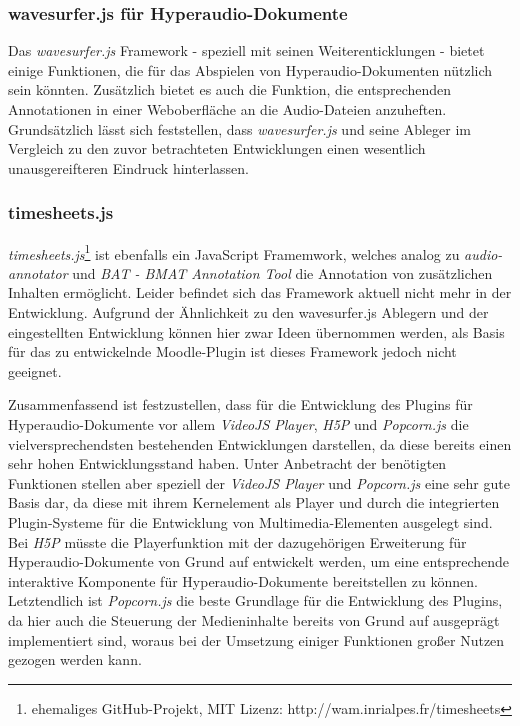 
\subsubsection{wavesurfer.js für Hyperaudio-Dokumente}
Das \textit{wavesurfer.js} Framework - speziell mit seinen Weiterenticklungen - bietet einige Funktionen, die für das Abspielen von Hyperaudio-Dokumenten nützlich sein könnten. Zusätzlich bietet es auch die Funktion,  die entsprechenden Annotationen in einer Weboberfläche an die Audio-Dateien anzuheften. Grundsätzlich lässt sich feststellen, dass \textit{wavesurfer.js} und seine Ableger im Vergleich zu den zuvor betrachteten Entwicklungen einen wesentlich unausgereifteren Eindruck hinterlassen.

\subsubsection{timesheets.js}
\textit{timesheets.js}\footnote{ehemaliges GitHub-Projekt, MIT Lizenz: http://wam.inrialpes.fr/timesheets} ist ebenfalls ein JavaScript Framemwork, welches analog zu \textit{audio-annotator} und \textit{BAT - BMAT Annotation Tool} die Annotation von zusätzlichen Inhalten ermöglicht. Leider befindet sich das Framework aktuell nicht mehr in der Entwicklung. Aufgrund der Ähnlichkeit zu den {wavesurfer.js} Ablegern und der eingestellten Entwicklung können hier zwar Ideen übernommen werden, als Basis für das zu entwickelnde Moodle-Plugin ist dieses Framework jedoch nicht geeignet.

Zusammenfassend ist festzustellen, dass für die Entwicklung des Plugins für Hyperaudio-Dokumente vor allem \textit{VideoJS Player}, \textit{H5P} und \textit{Popcorn.js} die vielversprechendsten bestehenden Entwicklungen darstellen, da diese bereits einen sehr hohen Entwicklungsstand haben. Unter Anbetracht der benötigten Funktionen stellen aber speziell der \textit{VideoJS Player} und \textit{Popcorn.js} eine sehr gute Basis dar, da diese mit ihrem Kernelement als Player und durch die integrierten Plugin-Systeme für die Entwicklung von Multimedia-Elementen ausgelegt sind. Bei \textit{H5P} müsste die Playerfunktion mit der dazugehörigen Erweiterung für Hyperaudio-Dokumente von Grund auf entwickelt werden, um eine entsprechende interaktive Komponente für Hyperaudio-Dokumente bereitstellen zu können. Letztendlich ist \textit{Popcorn.js} die beste Grundlage für die Entwicklung des Plugins, da hier auch die Steuerung der Medieninhalte bereits von Grund auf ausgeprägt implementiert sind, woraus bei der Umsetzung einiger Funktionen großer Nutzen gezogen werden kann.



